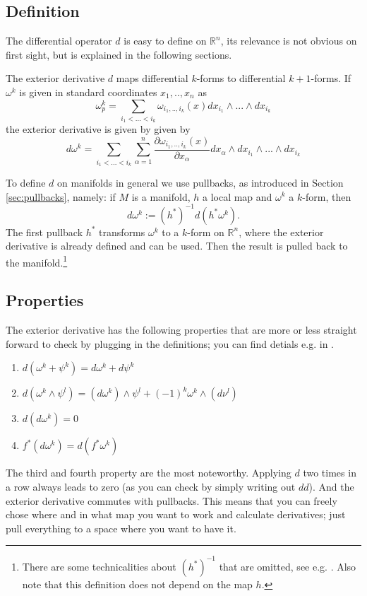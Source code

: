 \subsection{Definition} 
The differential operator $d$ is easy to define on $\mathbb R^n$, its relevance is not obvious on first sight, but is explained in the following sections.
\begin{definition}
The exterior derivative $d$ maps differential $k$-forms to differential $k+1$-forms. If $\omega^k$ is given in standard coordinates $x_1,..,x_n$ as 
\[\omega^k_p= \sum_{i_1<...<i_k} \omega_{i_1,..,i_k}(x) dx_{i_1} \wedge ... \wedge dx_{i_k}\]
the exterior derivative is given by
given by 
\[d\omega^k = \sum_{i_1<...<i_k}\sum_{\alpha = 1}^{n}\frac{\partial \omega_{i_1,..,i_k}(x)}{\partial x_\alpha} dx_{\alpha} \wedge dx_{i_1} \wedge ... \wedge dx_{i_k}\]
\end{definition}

To define $d$ on manifolds in general we use pullbacks, as introduced in Section \ref{sec:pullbacks}, namely: if $M$ is a manifold, $h$ a local map and $\omega^k$ a $k$-form, then
\[d\omega^k := (h^*)^{-1}d(h^*\omega^k).\]
The first pullback $h^*$ transforms $\omega^k$ to a $k$-form on $\mathbb R^n$, where the exterior derivative is already defined and can be used. Then the result is pulled back to the manifold.\footnote{There are some technicalities about $(h^*)^{-1}$ that are omitted, see e.g. \cite{globalAnalysis}. Also note that this definition does not depend on the map $h$.}

\subsection{Properties}
The exterior derivative has the following properties that are more or less straight forward to check by plugging in the definitions; you can find detials e.g. in \cite{globalAnalysis}.

\begin{enumerate}
\item $d(\omega^k + \psi^k) = d\omega^k + d\psi^k$
\item $d(\omega^k \wedge \psi^l) =( d\omega^k) \wedge \psi^l + (-1)^k \omega^k \wedge(d \nu^l)$
\item $d(d\omega^k) = 0$
\item $f^*(d\omega^k) = d(f^* \omega^k)$
\end{enumerate}
 The third and fourth property are the most noteworthy.  Applying $d$ two times in a row always leads to zero (as you can check by simply writing out $dd$). And the exterior derivative commutes with pullbacks. This means that you can freely chose where and in what map you want to work and calculate derivatives; just pull everything to a space where you want to have it.


